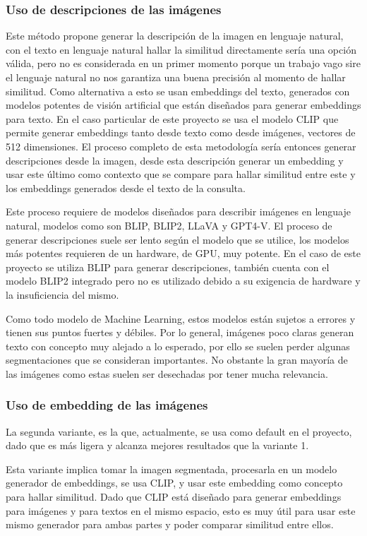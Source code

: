 \subsubsection*{Uso de descripciones de las imágenes}
Este método propone generar la descripción de la imagen en lenguaje natural, con el texto en lenguaje natural hallar la similitud directamente sería una opción válida, pero no es considerada en un primer momento porque un trabajo vago sire el lenguaje natural no nos garantiza una buena precisión al momento de hallar similitud. Como alternativa a esto se usan embeddings del texto, generados con modelos potentes de visión artificial que están diseñados para generar embeddings para texto. En el caso particular de este proyecto se usa el modelo CLIP que permite generar embeddings tanto desde texto como desde imágenes, vectores de 512 dimensiones. El proceso completo de esta metodología sería entonces generar descripciones desde la imagen, desde esta descripción generar un embedding y usar este último como contexto que se compare para hallar similitud entre este y los embeddings generados desde el texto de la consulta.

Este proceso requiere de modelos diseñados para describir imágenes en lenguaje natural, modelos como son BLIP, BLIP2, LLaVA y GPT4-V. El proceso de generar descripciones suele ser lento según el modelo que se utilice, los modelos más potentes requieren de un hardware, de GPU, muy potente. En el caso de este proyecto se utiliza BLIP para generar descripciones, también cuenta con el modelo BLIP2 integrado pero no es utilizado debido a su exigencia de hardware y la insuficiencia del mismo.

Como todo modelo de Machine Learning, estos modelos están sujetos a errores y tienen sus puntos fuertes y débiles. Por lo general, imágenes poco claras generan texto con concepto muy alejado a lo esperado, por ello se suelen perder algunas segmentaciones que se consideran importantes. No obstante la gran mayoría de las imágenes como estas suelen ser desechadas por tener mucha relevancia.

\subsubsection*{Uso de embedding de las imágenes}
La segunda variante, es la que, actualmente, se usa como default en el proyecto, dado que es más ligera y alcanza mejores resultados que la variante 1.

Esta variante implica tomar la imagen segmentada, procesarla en un modelo generador de embeddings, se usa CLIP, y usar este embedding como concepto para hallar similitud. Dado que CLIP está diseñado para generar embeddings para imágenes y para textos en el mismo espacio, esto es muy útil para usar este mismo generador para ambas partes y poder comparar similitud entre ellos.

